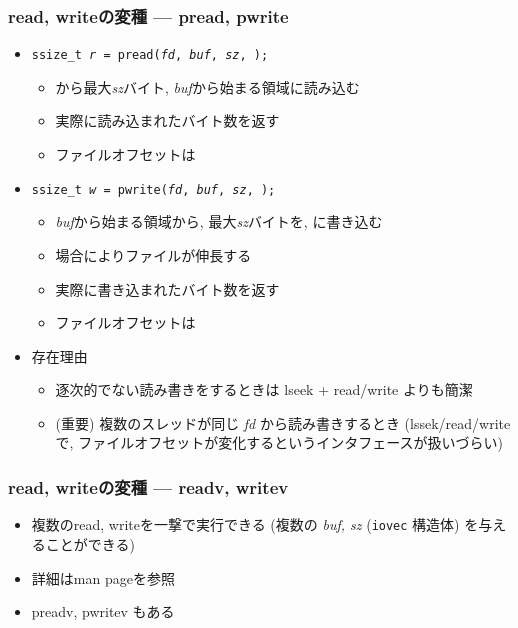 \documentclass[12pt,dvipdfmx]{beamer}
\begin{document}
\begin{frame}
  \frametitle{read, writeの変種 --- pread, pwrite}
  \begin{itemize}
  \item {\tt ssize\_t {\it r} = pread({\it fd}, {\it buf}, {\it sz}, );}
    \begin{itemize}
    \item {}から最大{\it sz}バイト, 
      {\it buf}から始まる領域に読み込む
    \item 実際に読み込まれたバイト数を返す
    \item ファイルオフセットは
    \end{itemize}
  \item {\tt ssize\_t {\it w} = pwrite({\it fd}, {\it buf}, {\it sz}, );}
    \begin{itemize}
    \item {\it buf}から始まる領域から, 最大{\it sz}バイトを,
      に書き込む
    \item 場合によりファイルが伸長する
    \item 実際に書き込まれたバイト数を返す
    \item ファイルオフセットは
    \end{itemize}
  \item 存在理由
    \begin{itemize}
    \item 逐次的でない読み書きをするときは lseek + read/write よりも簡潔
    \item (重要) 複数のスレッドが同じ {\it fd} から読み書きするとき
      (lssek/read/writeで,
      ファイルオフセットが変化するというインタフェースが扱いづらい)
    \end{itemize}
  \end{itemize}
\end{frame}

\begin{frame}
  \frametitle{read, writeの変種 --- readv, writev}
  \begin{itemize}
  \item 複数のread, writeを一撃で実行できる
    (複数の {\it buf, sz} ({\tt iovec} 構造体) を与えることができる)
  \item 詳細はman pageを参照
  \item preadv, pwritev もある
  \end{itemize}
\end{frame}
\end{document}
